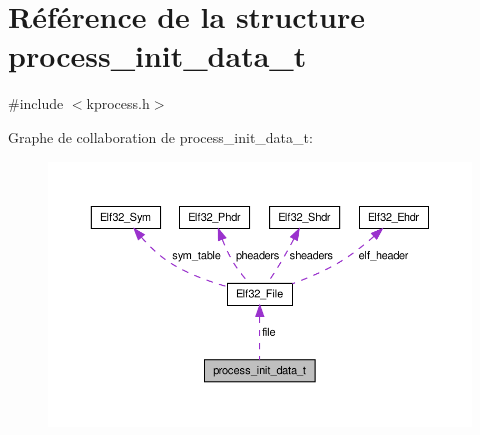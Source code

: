 \hypertarget{structprocess__init__data__t}{\section{Référence de la structure process\-\_\-init\-\_\-data\-\_\-t}
\label{structprocess__init__data__t}
}


{\ttfamily \#include $<$kprocess.\-h$>$}



Graphe de collaboration de process\-\_\-init\-\_\-data\-\_\-t\-:\nopagebreak
\begin{figure}[H]
\begin{center}
\leavevmode
\includegraphics[width=350pt]{structprocess__init__data__t__coll__graph}
\end{center}
\end{figure}
